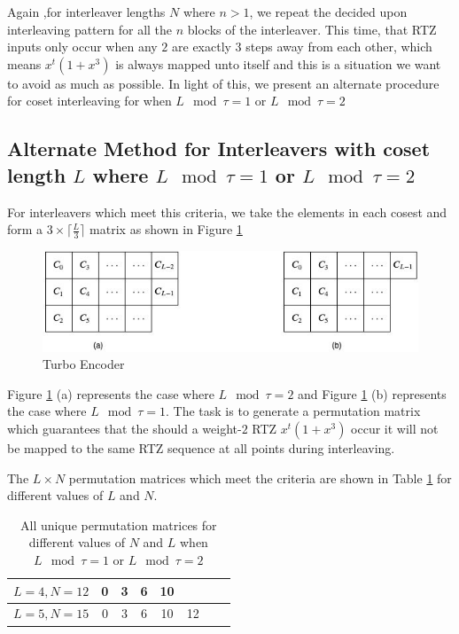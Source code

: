 \documentclass[11pt, oneside, dvipdfmx]{book}
\begin{document}
Again ,for interleaver lengths $N$ where $n>1$, we repeat the decided upon interleaving pattern for all the $n$ blocks of the interleaver. This time,  that RTZ inputs only occur when any $2$ are exactly $3$ steps away from each other, which means $x^t(1+x^3)$ is always mapped unto itself and this is a situation we want to avoid as much as possible. In light of this, we present an alternate procedure for coset interleaving for when $L \mod \tau =1$ or $L \mod \tau =2$ 
 
 
 \subsection{Alternate Method for Interleavers with coset length $L$ where $L \mod \tau =1$ or $L \mod \tau =2$}
 
 For interleavers which meet this criteria, we take the elements in each cosest and form a $3 \times \lceil \frac{L}{3} \rceil $ matrix as shown in Figure \ref{fig1}
 
 \begin{figure}[h!]
\centering
		\includegraphics[width=\textwidth]{cosetRep.jpg}
		\caption{Turbo Encoder}
		\label{fig1}
		\end{figure}
		
Figure \ref{fig1} (a) represents the case where $L \mod \tau =2$ and Figure \ref{fig1} (b) represents the case where $L \mod \tau =1$. The task is to generate a permutation matrix which guarantees that the should a weight-$2$ RTZ $x^t(1+x^3)$ occur it will not be mapped to the same RTZ sequence at all points during interleaving.

The $L \times N$ permutation matrices which meet the criteria are shown in Table \ref{tb4} for different values of $L$ and $N$. 

 \begin{table}[h!]
\centering
\begin{tabular}{|c || c  c  c  c  c  c c|} 
 \hline
 $L=4,N=12$ & 0 & 3 & 6 & 10 & & &\\ 
  \hline
 $L=5,N=15$ & 0 & 3 & 6 & 10 & 12 & &\\ 
  \hline
\end{tabular}
\caption{All unique permutation matrices for different values of $N$ and $L$ when $L \mod \tau =1$ or $L \mod \tau =2$}
\label{tb4}
\end{table}
\end{document}
